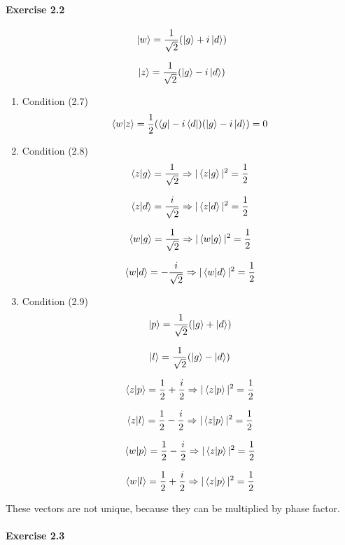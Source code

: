 \documentclass[a4paper]{article}
\begin{document}
\paragraph{Exercise 2.2}

$$
    \ket{w} = \frac{1}{\sqrt{2}} (\ket{g} + i \ket{d})
$$

$$
    \ket{z} = \frac{1}{\sqrt{2}} (\ket{g} - i \ket{d})
$$

\begin{enumerate}
    \item Condition (2.7)
        $$
            \bra{w}\ket{z} = \frac{1}{2} (\bra{g} - i \bra{d}) (\ket{g} - i \ket{d}) = 0
        $$
    \item Condition (2.8)
        $$
            \bra{z}\ket{g} = \frac{1}{\sqrt{2}} \Rightarrow |\bra{z}\ket{g}|^{2} = \frac{1}{2}
        $$

        $$
            \bra{z}\ket{d} =  \frac{i}{\sqrt{2}} \Rightarrow |\bra{z}\ket{d}|^{2} = \frac{1}{2}
        $$

        $$
            \bra{w}\ket{g} = \frac{1}{\sqrt{2}} \Rightarrow |\bra{w}\ket{g}|^{2} = \frac{1}{2}
        $$

        $$
            \bra{w}\ket{d} = - \frac{i}{\sqrt{2}} \Rightarrow |\bra{w}\ket{d}|^{2} = \frac{1}{2}
        $$
    \item Condition (2.9)
        $$
            \ket{p} = \frac{1}{\sqrt{2}} (\ket{g} + \ket{d})
        $$

        $$
            \ket{l} = \frac{1}{\sqrt{2}} (\ket{g} - \ket{d})
        $$

        $$
            \bra{z}\ket{p} = \frac{1}{2} + \frac{i}{2} \Rightarrow |\bra{z}\ket{p}|^{2} = \frac{1}{2}
        $$

        $$
            \bra{z}\ket{l} = \frac{1}{2} - \frac{i}{2} \Rightarrow |\bra{z}\ket{p}|^{2} = \frac{1}{2}
        $$

        $$
            \bra{w}\ket{p} = \frac{1}{2} - \frac{i}{2} \Rightarrow |\bra{z}\ket{p}|^{2} = \frac{1}{2}
        $$

        $$
            \bra{w}\ket{l} = \frac{1}{2} + \frac{i}{2} \Rightarrow |\bra{z}\ket{p}|^{2} = \frac{1}{2}
        $$
\end{enumerate}

These vectors are not unique, because they can be multiplied by phase factor.

\paragraph{Exercise 2.3}
\end{document}
